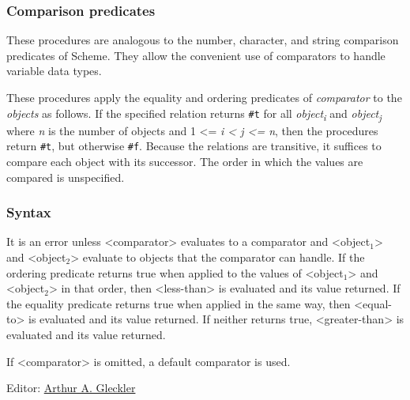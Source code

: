 \hypertarget{Comparisonpredicates}{\subsubsection{Comparison
predicates}}


\begin{entry}{%
  }

  These procedures are analogous to the number, character, and string
  comparison predicates of Scheme. They allow the convenient use of
  comparators to handle variable data types.

  These procedures apply the equality and ordering predicates of
  \emph{comparator} to the \emph{objects} as follows. If the specified
  relation returns \texttt{\#t} for all \emph{object\textsubscript{i}}
  and \emph{object\textsubscript{j}} where \emph{n} is the number of
  objects and 1 <= \emph{i < j <= n}, then the procedures return
  \texttt{\#t}, but otherwise \texttt{\#f}. Because the relations are
  transitive, it suffices to compare each object with its
  successor. The order in which the values are compared is
  unspecified.
\end{entry}

\hypertarget{Syntax}{\subsubsection{Syntax}}

\begin{entry}{%
  }

  It is an error unless <comparator> evaluates to a comparator and
  <object$_1$> and <object$_2$> evaluate to objects that the
  comparator can handle. If the ordering predicate returns true when
  applied to the values of <object$_1$> and <object$_2$> in that
  order, then <less-than> is evaluated and its value returned.  If the
  equality predicate returns true when applied in the same way, then
  <equal-to> is evaluated and its value returned. If neither returns
  true, <greater-than> is evaluated and its value returned.

  If <comparator> is omitted, a default comparator is used.


\end{entry}

Editor: \href{mailto:srfi-editors+at+srfi+dot+schemers+dot+org}{Arthur
A. Gleckler}
